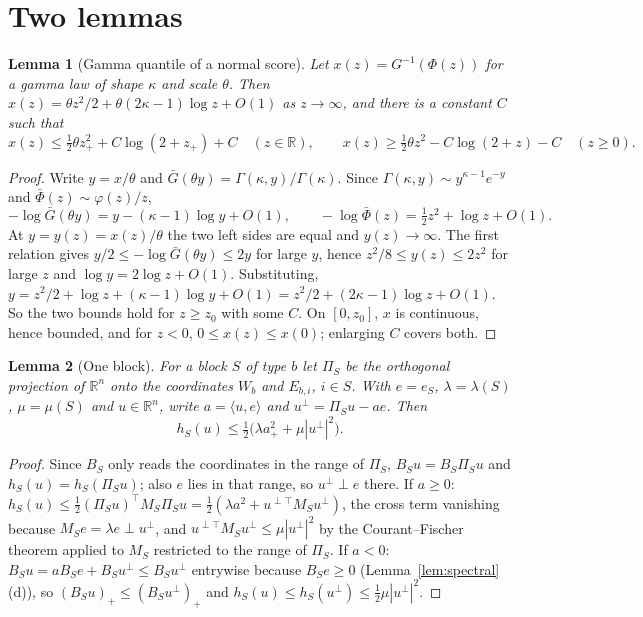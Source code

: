 \documentclass[pdflatex,sn-mathphys-ay]{sn-jnl}%
\theoremstyle{thmstyleone}%
\newtheorem{lemma}{Lemma}
\theoremstyle{thmstylethree}%
\theoremstyle{thmstyletwo}%
\newcommand{\R}{\mathbb{R}}
\newcommand{\ip}[2]{\langle #1,#2\rangle}
\begin{document}
\section{Two lemmas}
\label{sec:lemmas}

\begin{lemma}[Gamma quantile of a normal score]\label{lem:quantile}
Let $x(z)=G^{-1}(\Phi(z))$ for a gamma law of shape $\kappa$ and scale $\theta$. Then
$x(z)=\theta z^2/2+\theta(2\kappa-1)\log z+O(1)$ as $z\to\infty$, and there is a constant
$C$ such that
\[
x(z)\le\tfrac12\theta z_+^2+C\log(2+z_+)+C\quad(z\in\R),\qquad
x(z)\ge\tfrac12\theta z^2-C\log(2+z)-C\quad(z\ge0).
\]
\end{lemma}

\begin{proof}
Write $y=x/\theta$ and $\bar G(\theta y)=\Gamma(\kappa,y)/\Gamma(\kappa)$. Since
$\Gamma(\kappa,y)\sim y^{\kappa-1}e^{-y}$ \citep[\S8.11]{DLMF2010} and
$\bar\Phi(z)\sim\varphi(z)/z$,
\[
-\log\bar G(\theta y)=y-(\kappa-1)\log y+O(1),\qquad
-\log\bar\Phi(z)=\tfrac12z^2+\log z+O(1).
\]
At $y=y(z)=x(z)/\theta$ the two left sides are equal and $y(z)\to\infty$. The first relation
gives $y/2\le-\log\bar G(\theta y)\le2y$ for large $y$, hence $z^2/8\le y(z)\le2z^2$ for
large $z$ and $\log y=2\log z+O(1)$. Substituting,
$y=z^2/2+\log z+(\kappa-1)\log y+O(1)=z^2/2+(2\kappa-1)\log z+O(1)$. So the two bounds
hold for $z\ge z_0$ with some $C$. On $[0,z_0]$, $x$ is continuous, hence bounded, and
for $z<0$, $0\le x(z)\le x(0)$; enlarging $C$ covers both.
\end{proof}

\begin{lemma}[One block]\label{lem:block}
For a block $S$ of type $b$ let $\Pi_S$ be the orthogonal projection of $\R^n$ onto the
coordinates $W_b$ and $E_{b,i}$, $i\in S$. With $e=e_S$, $\lambda=\lambda(S)$, $\mu=\mu(S)$
and $u\in\R^n$, write $a=\ip ue$ and $u^\perp=\Pi_Su-ae$. Then
\[
h_S(u)\le\tfrac12\big(\lambda a_+^2+\mu|u^\perp|^2\big).
\]
\end{lemma}

\begin{proof}
Since $B_S$ only reads the coordinates in the range of $\Pi_S$, $B_Su=B_S\Pi_Su$ and
$h_S(u)=h_S(\Pi_Su)$; also $e$ lies in that range, so $u^\perp\perp e$ there. If $a\ge0$:
$h_S(u)\le\frac12(\Pi_Su)^\top M_S\Pi_Su=\frac12(\lambda a^2+u^{\perp\top}M_Su^\perp)$, the
cross term vanishing because $M_Se=\lambda e\perp u^\perp$, and
$u^{\perp\top}M_Su^\perp\le\mu|u^\perp|^2$ by the Courant--Fischer theorem applied to $M_S$
restricted to the range of $\Pi_S$. If $a<0$: $B_Su=aB_Se+B_Su^\perp\le B_Su^\perp$
entrywise because $B_Se\ge0$ (Lemma~\ref{lem:spectral}(d)), so
$(B_Su)_+\le(B_Su^\perp)_+$ and $h_S(u)\le h_S(u^\perp)\le\frac12\mu|u^\perp|^2$.
\end{proof}
\end{document}
